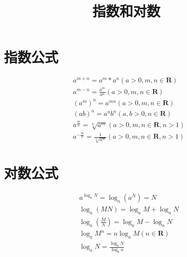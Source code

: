 \documentclass[UTF8,a4paper,10pt, twocolumn]{ctexart}
\title{指数和对数}
\begin{document}
\maketitle

\section{指数公式}
\begin{align}
  &a^{m+n} = a^m*a^n (a>0, m,n\in\mathbf{R}) \\
  &a^{m-n} = \frac{a^m}{a^n} (a>0, m,n\in\mathbf{R}) \\
  &(a^{m})^n = a^{mn} (a>0, m,n\in\mathbf{R}) \\
  &(ab)^{n} = a^{n}b^{n} (a,b>0, n\in\mathbf{R}) \\
  &a^{\frac{m}{n}} = \sqrt[n]{a^{m}} (a>0, m,n\in\mathbf{R}, n>1) \\
  &a^{-\frac{m}{n}} = \frac{1}{\sqrt[n]{a^{m}}} (a>0, m,n\in\mathbf{R}, n>1)
\end{align}

\section{对数公式}
\begin{align}
  &a^{\log_aN} = \log_{a}(a^{N}) = N \\
  &\log_{a}(MN) = \log_{a}M + \log_{a}N \\
  &\log_{a}(\frac{M}{N}) = \log_{a}M - \log_{a}N \\
  &\log_{a}M^{n} = n\log_{a}M (n\in\mathbf{R}) \\
  &\log_{a}N = \frac{\log_{b}N}{\log_{b}a}
\end{align}
\end{document}
